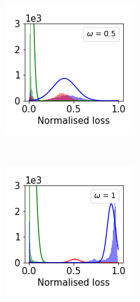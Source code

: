 \documentclass[12pt]{article}
\begin{document}
\begin{figure}[t]
\begin{subfigure}{.18\textwidth}
    \end{subfigure}
    \begin{subfigure}{.18\textwidth}
      \centering
      \includegraphics[width=\linewidth]{images/loss_dist/DM_0.6_0.50_imagenet32.png} 
    \end{subfigure}
    \\
    \begin{subfigure}{.18\textwidth}
      \centering
      \includegraphics[width=\linewidth]{images/loss_dist/EDM_0.6_0.00_cifar100.png} 

\end{subfigure}
\end{figure}
\end{document}
